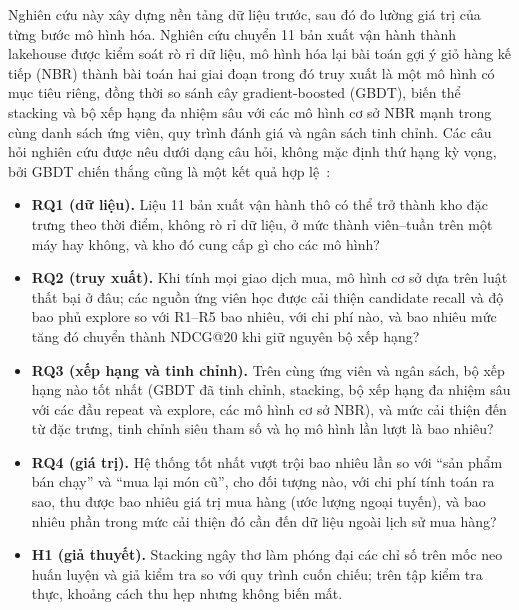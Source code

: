 \documentclass[jtehm]{ieeeaccess}
\begin{document}
Nghiên cứu này xây dựng nền tảng dữ liệu trước, sau đó đo lường giá trị của từng bước mô hình hóa. Nghiên cứu chuyển 11 bản xuất vận hành thành lakehouse được kiểm soát rò rỉ dữ liệu, mô hình hóa lại bài toán gợi ý giỏ hàng kế tiếp (NBR) thành bài toán hai giai đoạn trong đó truy xuất là một mô hình có mục tiêu riêng, đồng thời so sánh cây gradient-boosted (GBDT), biến thể stacking và bộ xếp hạng đa nhiệm sâu với các mô hình cơ sở NBR mạnh trong cùng danh sách ứng viên, quy trình đánh giá và ngân sách tinh chỉnh. Các câu hỏi nghiên cứu được nêu dưới dạng câu hỏi, không mặc định thứ hạng kỳ vọng, bởi GBDT chiến thắng cũng là một kết quả hợp lệ~\cite{grinsztajn2022tabular}:
\begin{itemize}
\item \textbf{RQ1 (dữ liệu).} Liệu 11 bản xuất vận hành thô có thể trở thành kho đặc trưng theo thời điểm, không rò rỉ dữ liệu, ở mức thành viên--tuần trên một máy hay không, và kho đó cung cấp gì cho các mô hình?
\item \textbf{RQ2 (truy xuất).} Khi tính mọi giao dịch mua, mô hình cơ sở dựa trên luật thất bại ở đâu; các nguồn ứng viên học được cải thiện candidate recall và độ bao phủ explore so với R1--R5 bao nhiêu, với chi phí nào, và bao nhiêu mức tăng đó chuyển thành NDCG@20 khi giữ nguyên bộ xếp hạng?
\item \textbf{RQ3 (xếp hạng và tinh chỉnh).} Trên cùng ứng viên và ngân sách, bộ xếp hạng nào tốt nhất (GBDT đã tinh chỉnh, stacking, bộ xếp hạng đa nhiệm sâu với các đầu repeat và explore, các mô hình cơ sở NBR), và mức cải thiện đến từ đặc trưng, tinh chỉnh siêu tham số và họ mô hình lần lượt là bao nhiêu?
\item \textbf{RQ4 (giá trị).} Hệ thống tốt nhất vượt trội bao nhiêu lần so với ``sản phẩm bán chạy'' và ``mua lại món cũ'', cho đối tượng nào, với chi phí tính toán ra sao, thu được bao nhiêu giá trị mua hàng (ước lượng ngoại tuyến), và bao nhiêu phần trong mức cải thiện đó cần đến dữ liệu ngoài lịch sử mua hàng?
\item \textbf{H1 (giả thuyết).} Stacking ngây thơ làm phóng đại các chỉ số trên mốc neo huấn luyện và giả kiểm tra so với quy trình cuốn chiếu; trên tập kiểm tra thực, khoảng cách thu hẹp nhưng không biến mất.
\end{itemize}
\end{document}
